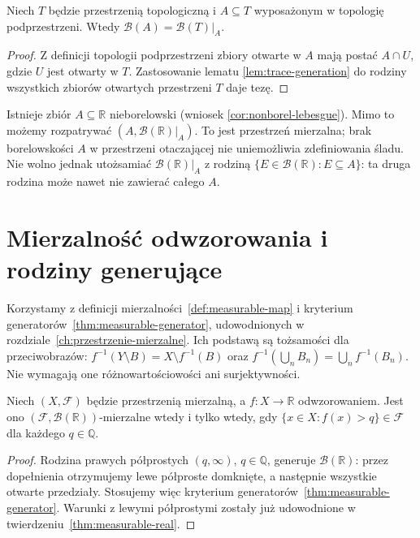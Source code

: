 \begin{twierdzenie}
\label{thm:borel-trace}
Niech $T$ będzie przestrzenią topologiczną i $A\subseteq T$
wyposażonym w topologię podprzestrzeni. Wtedy
$\mathcal B(A)=\mathcal B(T)|_A$.
\end{twierdzenie}
\begin{proof}
Z definicji topologii podprzestrzeni zbiory otwarte w $A$
mają postać $A\cap U$, gdzie $U$ jest otwarty w $T$.
Zastosowanie lematu \ref{lem:trace-generation} do rodziny
wszystkich zbiorów otwartych przestrzeni $T$ daje tezę.
\end{proof}

\begin{przyklad}
Istnieje zbiór $A\subseteq\mathbb R$ nieborelowski
(wniosek \ref{cor:nonborel-lebesgue}). Mimo to możemy
rozpatrywać $(A,\mathcal B(\mathbb R)|_A)$.
To jest przestrzeń mierzalna; brak borelowskości $A$
w przestrzeni otaczającej nie uniemożliwia
zdefiniowania śladu. Nie wolno jednak utożsamiać
$\mathcal B(\mathbb R)|_A$ z rodziną
$\{E\in\mathcal B(\mathbb R):E\subseteq A\}$:
ta druga rodzina może nawet nie zawierać całego $A$.
\end{przyklad}

\section{Mierzalność odwzorowania i rodziny generujące}

Korzystamy z definicji mierzalności~\ref{def:measurable-map} i kryterium generatorów~\ref{thm:measurable-generator}, udowodnionych w rozdziale~\ref{ch:przestrzenie-mierzalne}. Ich podstawą są tożsamości dla przeciwobrazów: $f^{-1}(Y\setminus B)=X\setminus f^{-1}(B)$ oraz $f^{-1}(\bigcup_n B_n)=\bigcup_n f^{-1}(B_n)$. Nie wymagają one różnowartościowości ani surjektywności.

\begin{wniosek}
\label{cor:real-borel-tests}
Niech $(X,\mathcal F)$ będzie przestrzenią mierzalną,
a $f:X\to\mathbb R$ odwzorowaniem. Jest ono
$(\mathcal F,\mathcal B(\mathbb R))$-mierzalne wtedy i tylko
wtedy, gdy $\{x\in X:f(x)>q\}\in\mathcal F$
dla każdego $q\in\mathbb Q$.
\end{wniosek}
\begin{proof}
Rodzina prawych półprostych $(q,\infty)$, $q\in\mathbb Q$,
generuje $\mathcal B(\mathbb R)$: przez dopełnienia
otrzymujemy lewe półproste domknięte, a następnie
wszystkie otwarte przedziały. Stosujemy więc
kryterium generatorów~\ref{thm:measurable-generator}.
Warunki z lewymi półprostymi zostały już udowodnione
w twierdzeniu~\ref{thm:measurable-real}.
\end{proof}

